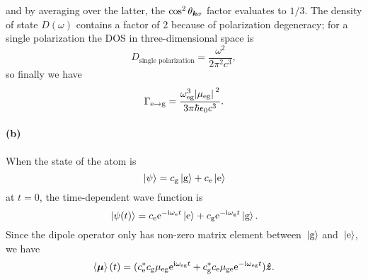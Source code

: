 \documentclass[hyperref, a4paper]{article}
\newcommand*{\ii}{\mathrm{i}}
\newcommand*{\ee}{\mathrm{e}}
\newcommand*{\omegae}{\omega_{\text{e}}}
\newcommand*{\omegag}{\omega_{\text{g}}}
\newcommand*{\omegaeg}{\omega_{\text{eg}}}
\newcommand*{\mueg}{\mu_{\text{eg}}}
\newcommand*{\muge}{\mu_{\text{ge}}}
\newcommand*{\kete}{\ket*{\text{e}}}
\newcommand*{\ketg}{\ket*{\text{g}}}
\newcommand*{\coeffe}{c_{\text{e}}}
\newcommand*{\coeffg}{c_{\text{g}}}
\begin{document}
and by averaging over the latter, 
the $\cos^2 \theta_{\vb*{k} \sigma}$  factor evaluates to $1/3$.
The density of state $D(\omega)$ contains a factor of $2$ 
because of polarization degeneracy;
for a single polarization the DOS in three-dimensional space is 
\begin{equation}
    D_{\text{single polarization}} = \frac{\omega^2}{2 \pi^2 c^3},
\end{equation}
so finally we have 
\begin{equation}
    \Gamma_{\text{e} \to \text{g}} = \frac{
        \omegaeg^3 \abs*{\mueg}^2
    }{
        3 \pi \hbar \epsilon_0 c^3
    }.
    \label{eq:fermi-golden-spontaneous-emission}
\end{equation}

\paragraph{(b)} When the state of the atom is 
\begin{equation}
    \ket*{\psi} = \coeffg \ketg + \coeffe \kete
\end{equation}
at $t = 0$, the time-dependent wave function is 
\begin{equation}
    \ket*{\psi(t)} = \coeffe \ee^{- \ii \omegae t} \kete 
    + \coeffg \ee^{- \ii \omegag t} \ketg.
\end{equation}
Since the dipole operator only has non-zero matrix element 
between $\ketg$ and $\kete$,
we have 
\begin{equation}
    \expval{\vb*{\mu}}(t) = (\coeffe^* \coeffg \mueg \ee^{\ii \omegaeg t}
    + \coeffg^* \coeffe \muge \ee^{- \ii \omegaeg t}) \vu*{z}.
    \label{eq:dipole-expectation-superposition}
\end{equation}
\end{document}
